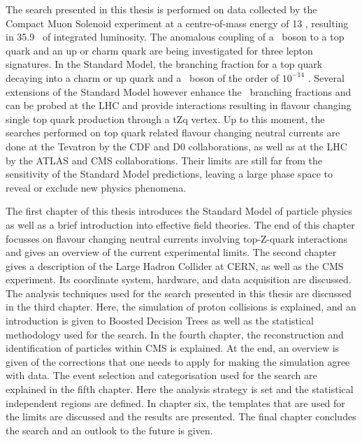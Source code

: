 The search presented in this thesis is performed on data collected by the Compact Muon Solenoid experiment at a centre-of-mass energy of 13 \TeV, resulting in 35.9 \fbinv\ of integrated luminosity. The anomalous coupling of a \PZ\ boson to a top quark and an up or charm quark are being investigated for three lepton signatures. In the Standard Model, the branching fraction for a top quark decaying into a charm or up quark and a \PZ\ boson of the order of $10^{-14}$ \cite{AguilarSaavedra:2004wm,PhysRevD.2.1285}. Several extensions of the Standard Model however enhance the \FCNC\ branching fractions and can be probed at the LHC \cite{AguilarSaavedra:2004wm} and provide interactions resulting in flavour changing single top quark production through a tZq vertex.  Up to this moment,  the searches performed on top quark related flavour changing neutral currents are done at the Tevatron by the CDF \cite{PhysRevLett.101.192002} and D0 \cite{Abazov:2010qk} collaborations, as well as at the LHC by the ATLAS \cite{Aad:2015uza,Aad:2015gea} and CMS \cite{Sirunyan:2017kkr,Chatrchyan:2013nwa,Khachatryan:2015att,Sirunyan:2017kkr}  collaborations. Their limits are still far from the sensitivity of the Standard Model predictions,  leaving a large phase space to reveal or exclude new physics phenomena. 


The first chapter of this thesis introduces the Standard Model of particle physics as well as a brief introduction into effective field theories. The end of this chapter focusses on flavour changing neutral currents involving top-Z-quark interactions and gives an overview of the current experimental limits.  The second chapter gives a description of the Large Hadron Collider at CERN, as well as the CMS experiment. Its coordinate system, hardware, and data acquisition are discussed. The analysis techniques used for the search  presented in this thesis are discussed in the third chapter. Here, the simulation of proton collisions is explained, and an introduction is given to Boosted Decision Trees as well as the statistical methodology used for the search. In the fourth chapter, the reconstruction and identification of particles within CMS is explained. At the end, an overview is given of the corrections that one needs to apply for making the simulation agree with data. The event selection and categorisation used for the search are explained in the fifth chapter. Here the analysis strategy is set and the statistical independent regions are defined. In chapter six, the templates that are used for the limits are discussed and the results are presented. The final chapter concludes the search and an outlook to the future is given. 
